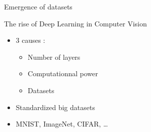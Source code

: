 \documentclass[11pt]{beamer}
\begin{document}
\begin{frame}{Emergence of datasets}
  \begin{block}{The rise of Deep Learning in Computer Vision}
    \begin{itemize}
    \item 3 causes :
      \begin{itemize}
      \item Number of layers
      \item Computationnal power
      \item Datasets
      \end{itemize}
    \item Standardized big datasets
    \item MNIST, ImageNet, CIFAR, \dots
      \vfill
    \end{itemize}
  \end{block}
\end{frame}
\end{document}
